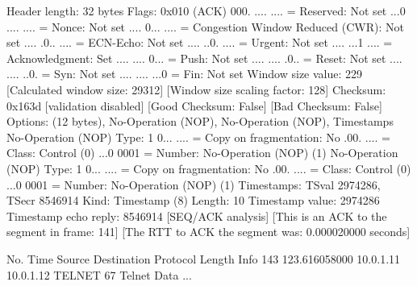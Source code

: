     Header length: 32 bytes
    Flags: 0x010 (ACK)
        000. .... .... = Reserved: Not set
        ...0 .... .... = Nonce: Not set
        .... 0... .... = Congestion Window Reduced (CWR): Not set
        .... .0.. .... = ECN-Echo: Not set
        .... ..0. .... = Urgent: Not set
        .... ...1 .... = Acknowledgment: Set
        .... .... 0... = Push: Not set
        .... .... .0.. = Reset: Not set
        .... .... ..0. = Syn: Not set
        .... .... ...0 = Fin: Not set
    Window size value: 229
    [Calculated window size: 29312]
    [Window size scaling factor: 128]
    Checksum: 0x163d [validation disabled]
        [Good Checksum: False]
        [Bad Checksum: False]
    Options: (12 bytes), No-Operation (NOP), No-Operation (NOP), Timestamps
        No-Operation (NOP)
            Type: 1
                0... .... = Copy on fragmentation: No
                .00. .... = Class: Control (0)
                ...0 0001 = Number: No-Operation (NOP) (1)
        No-Operation (NOP)
            Type: 1
                0... .... = Copy on fragmentation: No
                .00. .... = Class: Control (0)
                ...0 0001 = Number: No-Operation (NOP) (1)
        Timestamps: TSval 2974286, TSecr 8546914
            Kind: Timestamp (8)
            Length: 10
            Timestamp value: 2974286
            Timestamp echo reply: 8546914
    [SEQ/ACK analysis]
        [This is an ACK to the segment in frame: 141]
        [The RTT to ACK the segment was: 0.000020000 seconds]

No.     Time           Source                Destination           Protocol Length Info
    143 123.616058000  10.0.1.11             10.0.1.12             TELNET   67     Telnet Data ...

